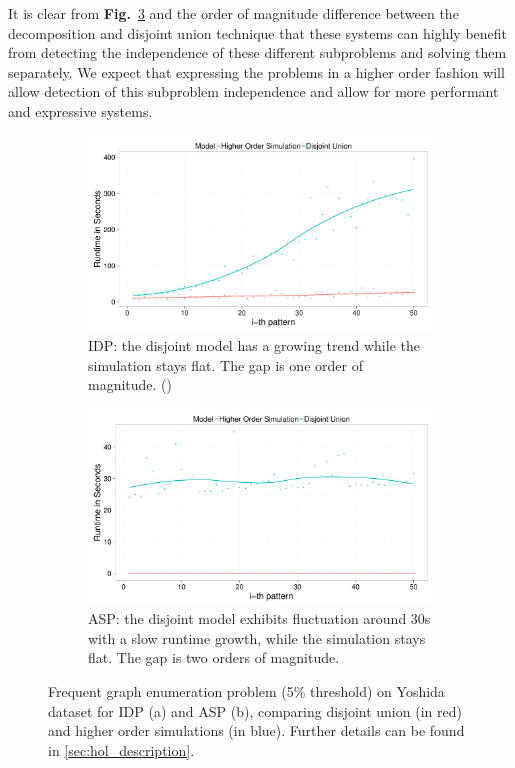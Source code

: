 It is clear from \textbf{Fig.}~\ref{fig:decomposition_fol} and the order of magnitude difference between the decomposition and disjoint union technique that these systems can highly benefit from detecting the independence of these different subproblems and solving them separately.
We expect that expressing the problems in a higher order fashion will allow detection of this subproblem independence and allow for more performant and expressive systems.
\begin{figure}[thb]
\centering
\begin{subfigure}{.44\textwidth}
  \centering
\includegraphics[scale=0.14]{extra/figure_comparison_yoshida.pdf}
\caption{\footnotesize{IDP: the disjoint model has a growing trend while the simulation stays flat. The gap is one order of magnitude. (\cite{ilp_graph_mining})}}
  \label{fig:decomposition_idp}
\end{subfigure}%
\hfill
\begin{subfigure}{0.46\textwidth}
  \centering
 \includegraphics[scale=0.14]{extra/asp_fol_vs_decomposed_yoshida.pdf}
 \caption{\footnotesize{ASP: the disjoint model exhibits fluctuation around 30s with a slow runtime growth, while the simulation stays flat. The gap is two orders of magnitude.}}
  \label{fig:decomposition_asp}
\end{subfigure}
\caption{\footnotesize{Frequent graph enumeration problem (5\% threshold) on Yoshida dataset for IDP (a) and ASP (b), comparing disjoint union (in red) and higher order simulations (in blue). Further details can be found in \ref{sec:hol_description}.}}
\label{fig:decomposition_fol}
\end{figure}

